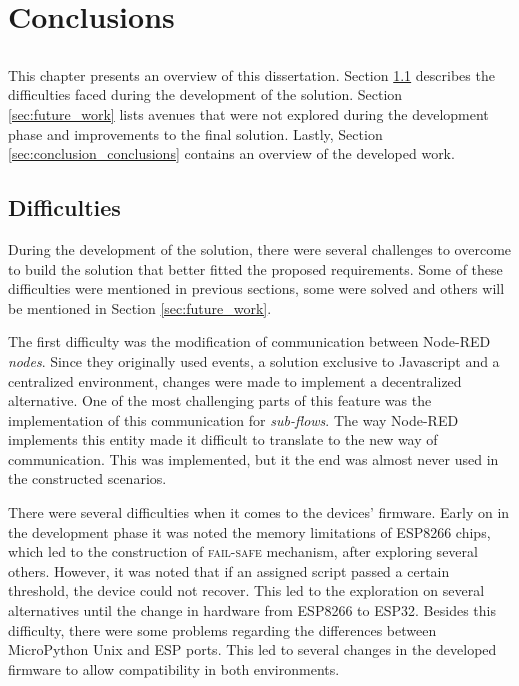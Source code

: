 \chapter{Conclusions} \label{chap:concl} \minitoc

\section*{}

This chapter presents an overview of this dissertation. Section \ref{sec:difficulties} describes the difficulties faced during the development of the solution. Section \ref{sec:future_work} lists avenues that were not explored during the development phase and improvements to the final solution. Lastly, Section \ref{sec:conclusion_conclusions} contains an overview of the developed work.


\section{Difficulties}\label{sec:difficulties}

During the development of the solution, there were several challenges to overcome to build the solution that better fitted the proposed requirements. Some of these difficulties were mentioned in previous sections, some were solved and others will be mentioned in Section \ref{sec:future_work}.

The first difficulty was the modification of communication between Node-RED \textit{nodes}. Since they originally used events, a solution exclusive to Javascript and a centralized environment, changes were made to implement a decentralized alternative. One of the most challenging parts of this feature was the implementation of this communication for \emph{sub-flows}. The way Node-RED implements this entity made it difficult to translate to the new way of communication. This was implemented, but it the end was almost never used in the constructed scenarios.

There were several difficulties when it comes to the devices' firmware. Early on in the development phase it was noted the memory limitations of ESP8266 chips, which led to the construction of \textsc{fail-safe} mechanism, after exploring several others. However, it was noted that if an assigned script passed a certain threshold, the device could not recover. This led to the exploration on several alternatives until the change in hardware from ESP8266 to ESP32. Besides this difficulty, there were some problems regarding the differences between MicroPython Unix and ESP ports. This led to several changes in the developed firmware to allow compatibility in both environments. 

